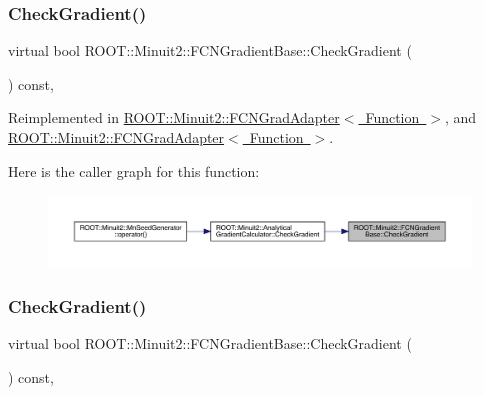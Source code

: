 \subsubsection{\texorpdfstring{CheckGradient()}{CheckGradient()}\hspace{0.1cm}{\footnotesize\ttfamily [1/2]}}
{\footnotesize\ttfamily virtual bool R\+O\+O\+T\+::\+Minuit2\+::\+F\+C\+N\+Gradient\+Base\+::\+Check\+Gradient (\begin{DoxyParamCaption}{ }\end{DoxyParamCaption}) const\hspace{0.3cm}{\ttfamily [inline]}, {\ttfamily [virtual]}}



Reimplemented in \mbox{\hyperlink{classROOT_1_1Minuit2_1_1FCNGradAdapter_a10faf0c868284a440f291465b7efd08e}{R\+O\+O\+T\+::\+Minuit2\+::\+F\+C\+N\+Grad\+Adapter$<$ Function $>$}}, and \mbox{\hyperlink{classROOT_1_1Minuit2_1_1FCNGradAdapter_a10faf0c868284a440f291465b7efd08e}{R\+O\+O\+T\+::\+Minuit2\+::\+F\+C\+N\+Grad\+Adapter$<$ Function $>$}}.

Here is the caller graph for this function\+:\nopagebreak
\begin{figure}[H]
\begin{center}
\leavevmode
\includegraphics[width=350pt]{d2/d53/classROOT_1_1Minuit2_1_1FCNGradientBase_ae69375c7506f0be6a1ab4e4e937ac555_icgraph}
\end{center}
\end{figure}
\mbox{\label{classROOT_1_1Minuit2_1_1FCNGradientBase_ae69375c7506f0be6a1ab4e4e937ac555}} 
\subsubsection{\texorpdfstring{CheckGradient()}{CheckGradient()}\hspace{0.1cm}{\footnotesize\ttfamily [2/2]}}
{\footnotesize\ttfamily virtual bool R\+O\+O\+T\+::\+Minuit2\+::\+F\+C\+N\+Gradient\+Base\+::\+Check\+Gradient (\begin{DoxyParamCaption}{ }\end{DoxyParamCaption}) const\hspace{0.3cm}{\ttfamily [inline]}, {\ttfamily [virtual]}}



